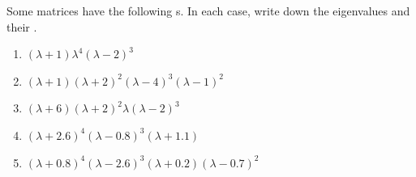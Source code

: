 \begin{exercise}
Some matrices have the following s.
In each case, write down the eigenvalues and their .

\begin{enumerate}
\item \((\lambda+1)\lambda^4(\lambda-2)^3\)
\item \((\lambda+1)(\lambda+2)^2(\lambda-4)^3(\lambda-1)^2\)
\item \((\lambda+6)(\lambda+2)^2\lambda(\lambda-2)^3\)
\item \((\lambda+2.6)^4(\lambda-0.8)^3(\lambda+1.1)\)
\item \((\lambda+0.8)^4(\lambda-2.6)^3(\lambda+0.2)(\lambda-0.7)^2\)

\end{enumerate}
\end{exercise}







